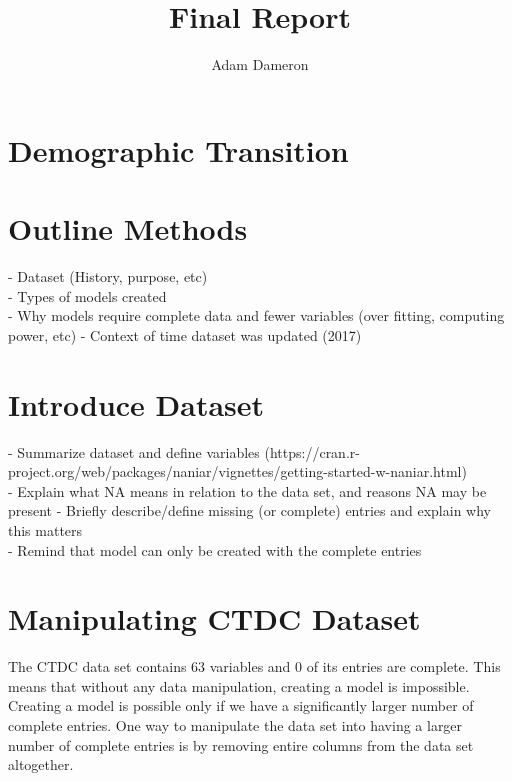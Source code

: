 \documentclass{article} %
\title{Final Report}
\author{
	Adam Dameron
}
\begin{document}
	
	
	\maketitle
	
	\begin{abstract}
		
	\end{abstract}
	
	\section{Demographic Transition}
	
	\section{Outline Methods}
	
	- Dataset (History, purpose, etc)\\
	- Types of models created\\
		- Why models require complete data and fewer variables (over fitting, computing power, etc)
		- Context of time dataset was updated (2017)
	
	
	\section{Introduce Dataset}
	
	- Summarize dataset and define variables (https://cran.r-project.org/web/packages/naniar/vignettes/getting-started-w-naniar.html)\\
	- Explain what NA means in relation to the data set, and reasons NA may be present
	- Briefly describe/define missing (or complete) entries and explain why this matters\\
	- Remind that model can only be created with the complete entries\\
	
	\newpage
	\section{Manipulating CTDC Dataset}
	

	
	The CTDC data set contains 63 variables and 0 of its entries are complete. This means that without any data manipulation, creating a model is impossible. Creating a model is possible only if we have a significantly larger number of complete entries. One way to manipulate the data set into having a larger number of complete entries is by removing entire columns from the data set altogether. 
	
\end{document}
